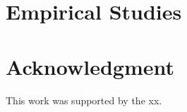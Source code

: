 \documentclass[journal]{IEEEtran}
\begin{document}
\section{Empirical Studies}









\section*{Acknowledgment}
This work was supported by the xx. 



  



\end{document}
